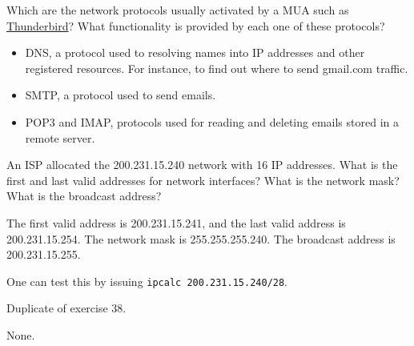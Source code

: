 \begin{Exercise}
Which are the network protocols usually activated by a MUA such as \href{https://en.wikipedia.org/wiki/Mozilla_Thunderbird}{Thunderbird}?
What functionality is provided by each one of these protocols?
\end{Exercise}
\begin{Answer}
\begin{itemize}
    \item DNS, a protocol used to resolving names into IP addresses and other registered resources. For instance, to find out where to send gmail.com traffic.
    \item SMTP, a protocol used to send emails.
    \item POP3 and IMAP, protocols used for reading and deleting emails stored in a remote server.
\end{itemize}
\end{Answer}

\begin{Exercise}
An ISP allocated the 200.231.15.240 network with 16 IP addresses. What is the first and last valid addresses for network interfaces? What is the network mask? What is the broadcast address?
\end{Exercise}
\begin{Answer}
The first valid address is 200.231.15.241, and the last valid address is 200.231.15.254.
The network mask is 255.255.255.240. The broadcast address is 200.231.15.255.

One can test this by issuing \texttt{ipcalc 200.231.15.240/28}.
\end{Answer}

\begin{Exercise}
Duplicate of exercise 38.
\end{Exercise}
\begin{Answer}
None.
\end{Answer}


